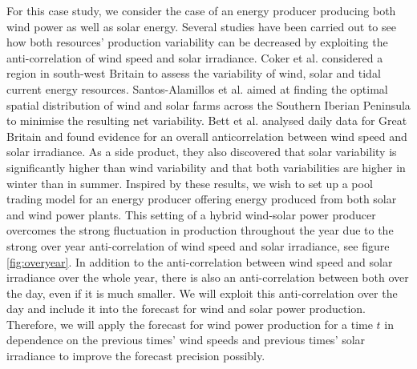 For this case study, we consider the case of an energy producer producing both wind power as well as solar energy. Several studies have been carried out to see how both resources' production variability  can be decreased by exploiting the anti-correlation of wind speed and solar irradiance. Coker et al. \cite{Coker2013} considered a region in south-west Britain to assess the variability of wind, solar and tidal current energy resources. Santos-Alamillos et al. \cite{Santos-Alamillos} aimed at finding the optimal spatial distribution of wind and solar farms across the Southern Iberian Peninsula to minimise the resulting net variability. Bett et al. \cite{BETT16} analysed daily data for Great Britain and found  evidence for an overall anticorrelation between wind speed and solar irradiance. As a side product, they also discovered that solar variability is significantly higher than wind variability and that both variabilities are higher in winter than in summer. Inspired by these results, we wish to set up a pool trading model for an energy producer offering energy produced from both solar and wind power plants.  
This setting of a hybrid wind-solar power producer
	overcomes the strong fluctuation in production throughout the year due to the strong over year anti-correlation of wind speed and solar irradiance, see figure \ref{fig:overyear}. In addition to
	the anti-correlation between wind speed and solar irradiance over the whole year, there is also an anti-correlation between both over the day, even if it is much smaller. We will exploit this anti-correlation over the day and include it into the forecast
	for wind and solar power production. Therefore, we will apply the forecast for wind power production for a time $t$ in dependence on the previous times' wind speeds and previous times' solar irradiance to improve the forecast precision possibly.

